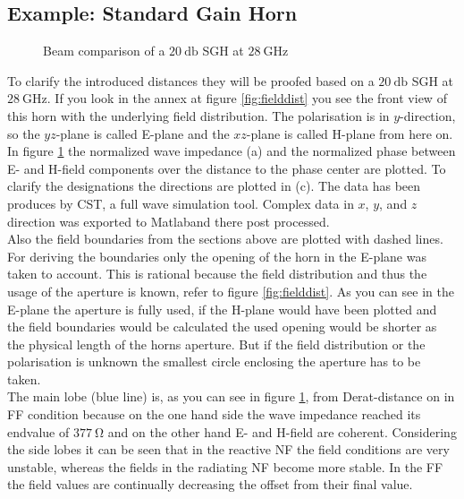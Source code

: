 \subsection{Example: Standard Gain Horn}

\begin{figure}[H]
\centering
  \centering
  \centering
  \centering
\caption{Beam comparison of a $\SI{20}{\decibel}$ \ac{SGH} at $\SI{28}{\giga\hertz}$}
\label{fig:beamcpmp}
\end{figure}

To clarify the introduced distances they will be proofed based on a $\SI{20}{\decibel}$ \ac{SGH} at $\SI{28}{\giga\hertz}$. If you look in the annex at figure \ref{fig:fielddist} you see the front view of this horn with the underlying field distribution. The polarisation is in $y$-direction, so the $yz$-plane is called E-plane and the $xz$-plane is called H-plane from here on.\\
In figure \ref{fig:beamcpmp} the normalized wave impedance (a) and the normalized phase between E- and H-field components over the distance to the phase center are plotted. To clarify the designations the directions are plotted in (c). The data has been produces by CST\texttrademark , a full wave simulation tool. Complex data in $x$, $y$, and $z$ direction was exported to Matlab\texttrademark and there post processed.\\
Also the field boundaries from the sections above are plotted with dashed lines. For deriving the boundaries only the opening of the horn in the E-plane was taken to account. This is rational because the field distribution and thus the usage of the aperture is known, refer to figure \ref{fig:fielddist}. As you can see in the E-plane the aperture is fully used, if the H-plane would have been plotted and the field boundaries would be calculated the used opening would be shorter as the physical length of the horns aperture. But if the field distribution or the polarisation is unknown the smallest circle enclosing the aperture has to be taken.\\
The main lobe (blue line) is, as you can see in figure \ref{fig:beamcpmp}, from Derat-distance on in \ac{FF} condition because on the one hand side the wave impedance reached its endvalue of $\SI{377}{\ohm}$ and on the other hand E- and H-field are coherent.
Considering the side lobes it can be seen that in the reactive \ac{NF} the field conditions are very unstable, whereas the fields in the radiating \ac{NF} become more stable. In the \ac{FF} the field values are continually decreasing the offset from their final value.

